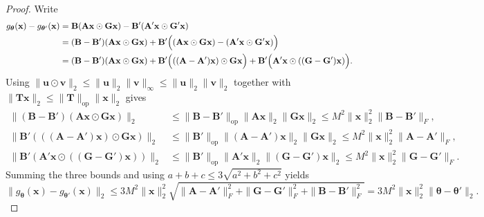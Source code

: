 \begin{proof}
Write
\begin{align*}
g_{\boldsymbol{\theta}}(\mathbf{x})-g_{\boldsymbol{\theta}'}(\mathbf{x})
&=
\mathbf{B}(\mathbf{A}\mathbf{x}\odot \mathbf{G}\mathbf{x})-\mathbf{B}'(\mathbf{A}'\mathbf{x}\odot \mathbf{G}'\mathbf{x}) \\
&=
(\mathbf{B}-\mathbf{B}')(\mathbf{A}\mathbf{x}\odot \mathbf{G}\mathbf{x})
+
\mathbf{B}'\Bigl((\mathbf{A}\mathbf{x}\odot \mathbf{G}\mathbf{x})-(\mathbf{A}'\mathbf{x}\odot \mathbf{G}'\mathbf{x})\Bigr) \\
&=
(\mathbf{B}-\mathbf{B}')(\mathbf{A}\mathbf{x}\odot \mathbf{G}\mathbf{x})
+
\mathbf{B}'\Bigl(((\mathbf{A}-\mathbf{A}')\mathbf{x})\odot \mathbf{G}\mathbf{x}\Bigr)
+
\mathbf{B}'\Bigl(\mathbf{A}'\mathbf{x}\odot ((\mathbf{G}-\mathbf{G}')\mathbf{x})\Bigr).
\end{align*}
Using
$\|\mathbf{u}\odot \mathbf{v}\|_{2} \le \|\mathbf{u}\|_{2}\|\mathbf{v}\|_\infty \le \|\mathbf{u}\|_{2}\|\mathbf{v}\|_{2}$
together with
$\|\mathbf{T}\mathbf{x}\|_{2}\le \|\mathbf{T}\|_{\mathrm{op}}\|\mathbf{x}\|_{2}$
gives
\begin{align*}
\|(\mathbf{B}-\mathbf{B}')(\mathbf{A}\mathbf{x}\odot \mathbf{G}\mathbf{x})\|_{2}
&\le
\|\mathbf{B}-\mathbf{B}'\|_{\mathrm{op}}\|\mathbf{A}\mathbf{x}\|_{2}\|\mathbf{G}\mathbf{x}\|_{2}
\le
M^2\|\mathbf{x}\|_{2}^2\|\mathbf{B}-\mathbf{B}'\|_{F},\\
\|\mathbf{B}'(((\mathbf{A}-\mathbf{A}')\mathbf{x})\odot \mathbf{G}\mathbf{x})\|_{2}
&\le
\|\mathbf{B}'\|_{\mathrm{op}}\|(\mathbf{A}-\mathbf{A}')\mathbf{x}\|_{2}\|\mathbf{G}\mathbf{x}\|_{2}
\le
M^2\|\mathbf{x}\|_{2}^2\|\mathbf{A}-\mathbf{A}'\|_{F},\\
\|\mathbf{B}'(\mathbf{A}'\mathbf{x}\odot ((\mathbf{G}-\mathbf{G}')\mathbf{x}))\|_{2}
&\le
\|\mathbf{B}'\|_{\mathrm{op}}\|\mathbf{A}'\mathbf{x}\|_{2}\|(\mathbf{G}-\mathbf{G}')\mathbf{x}\|_{2}
\le
M^2\|\mathbf{x}\|_{2}^2\|\mathbf{G}-\mathbf{G}'\|_{F}.
\end{align*}
Summing the three bounds and using
$a+b+c\le 3\sqrt{a^2+b^2+c^2}$ yields
\[
\|g_{\boldsymbol{\theta}}(\mathbf{x})-g_{\boldsymbol{\theta}'}(\mathbf{x})\|_{2}
\le
3M^2\|\mathbf{x}\|_{2}^2
\sqrt{
\|\mathbf{A}-\mathbf{A}'\|_{F}^2+\|\mathbf{G}-\mathbf{G}'\|_{F}^2+\|\mathbf{B}-\mathbf{B}'\|_{F}^2
}
=
3M^2\|\mathbf{x}\|_{2}^2\|\boldsymbol{\theta}-\boldsymbol{\theta}'\|_{2}.
\]
\end{proof}




